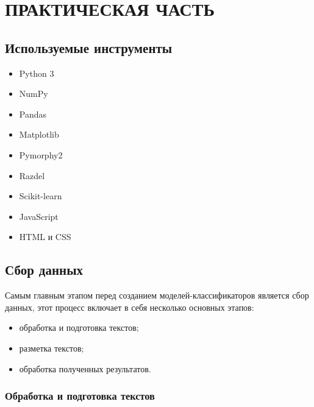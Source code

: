\section{ПРАКТИЧЕСКАЯ ЧАСТЬ}


\subsection{Используемые инструменты}

\begin{itemize}
 \item Python 3


 \item NumPy


 \item Pandas


 \item Matplotlib


 \item Pymorphy2


 \item Razdel


 \item Scikit-learn


 \item JavaScript


 \item HTML и CSS



\end{itemize}














\subsection{Сбор данных}


Самым главным этапом перед созданием моделей-классификаторов является сбор данных, этот процесс включает в себя несколько основных этапов:

\bigskip
\begin{itemize}
 \item обработка и подготовка текстов;
 \item разметка текстов;
 \item обработка полученных результатов.
\end{itemize}

\subsubsection{Обработка и подготовка текстов}


